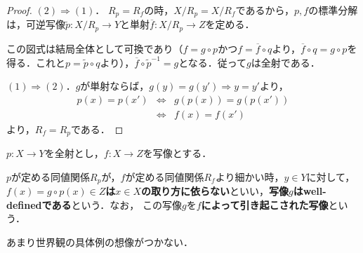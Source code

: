 \documentclass[uplatex, 12pt, dvipdfmx]{jsreport}
\begin{document}
\begin{proof}
    $(2)\Rightarrow(1)$． $R_p=R_f$の時，$X/R_p=X/R_f$であるから，$p,f$の標準分解は，可逆写像$\tilde{p}:X/R_p\to Y$と単射$\overline{f}:X/R_p\to Z$を定める．
    \begin{center}\end{center}
    この図式は結局全体として可換であり（$f=g\circ p$かつ$f=\overline{f}\circ q$より，$\overline{f}\circ q=g\circ p$を得る．これと$p=\tilde{p}\circ q$より），$\overline{f}\circ\tilde{p}^{-1}=g$となる．従って$g$は全射である．

    $(1)\Rightarrow(2)$．$g$が単射ならば，$g(y)=g(y')\Rightarrow y=y'$より，
    \begin{eqnarray*}
        p(x)=p(x') &\Leftrightarrow& g(p(x))=g(p(x')) \\
        &\Leftrightarrow& f(x)=f(x')
    \end{eqnarray*}
    より，$R_f=R_p$である．
\end{proof}

\begin{definition}\rm{}
    $p:X\to Y$を全射とし，$f:X\to Z$を写像とする．
    \begin{center}\end{center}
    $p$が定める同値関係$R_p$が，$f$が定める同値関係$R_f$より細かい時，$y\in Y$に対して，\textbf{$f(x)=g\circ p(x)\in Z$は$x\in X$の取り方に依らない}といい，\textbf{写像$g$はwell-definedである}という．なお，
    この写像$g$を\textbf{$f$によって引き起こされた写像}という．
\end{definition}
\begin{remark}
    あまり世界観の具体例の想像がつかない．
\end{remark}
\end{document}
